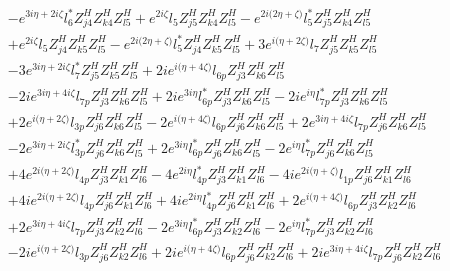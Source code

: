 \begin{align}
 &- e^{3 i \eta +2 i \zeta } l_6^* Z_{{j 4}}^{H} Z_{{k 4}}^{H} Z_{{l 5}}^{H} +e^{2 i \zeta } l_5 Z_{{j 5}}^{H} Z_{{k 4}}^{H} Z_{{l 5}}^{H} - e^{2 i \Big(2 \eta +\zeta \Big)} l_5^* Z_{{j 5}}^{H} Z_{{k 4}}^{H} Z_{{l 5}}^{H} \nonumber \\ 
 &+e^{2 i \zeta } l_5 Z_{{j 4}}^{H} Z_{{k 5}}^{H} Z_{{l 5}}^{H} - e^{2 i \Big(2 \eta +\zeta \Big)} l_5^* Z_{{j 4}}^{H} Z_{{k 5}}^{H} Z_{{l 5}}^{H} +3 e^{i \Big(\eta +2 \zeta \Big)} l_7 Z_{{j 5}}^{H} Z_{{k 5}}^{H} Z_{{l 5}}^{H} \nonumber \\ 
 &-3 e^{3 i \eta +2 i \zeta } l_7^* Z_{{j 5}}^{H} Z_{{k 5}}^{H} Z_{{l 5}}^{H} +2 i e^{i \Big(\eta +4 \zeta \Big)} l_{6p} Z_{{j 3}}^{H} Z_{{k 6}}^{H} Z_{{l 5}}^{H} \nonumber \\ 
 &-2 i e^{3 i \eta +4 i \zeta } l_{7p} Z_{{j 3}}^{H} Z_{{k 6}}^{H} Z_{{l 5}}^{H} +2 i e^{3 i \eta } l_{6p}^* Z_{{j 3}}^{H} Z_{{k 6}}^{H} Z_{{l 5}}^{H} -2 i e^{i \eta } l_{7p}^* Z_{{j 3}}^{H} Z_{{k 6}}^{H} Z_{{l 5}}^{H} \nonumber \\ 
 &+2 e^{i \Big(\eta +2 \zeta \Big)} l_{3p} Z_{{j 6}}^{H} Z_{{k 6}}^{H} Z_{{l 5}}^{H} -2 e^{i \Big(\eta +4 \zeta \Big)} l_{6p} Z_{{j 6}}^{H} Z_{{k 6}}^{H} Z_{{l 5}}^{H} +2 e^{3 i \eta +4 i \zeta } l_{7p} Z_{{j 6}}^{H} Z_{{k 6}}^{H} Z_{{l 5}}^{H} \nonumber \\ 
 &-2 e^{3 i \eta +2 i \zeta } l_{3p}^* Z_{{j 6}}^{H} Z_{{k 6}}^{H} Z_{{l 5}}^{H} +2 e^{3 i \eta } l_{6p}^* Z_{{j 6}}^{H} Z_{{k 6}}^{H} Z_{{l 5}}^{H} -2 e^{i \eta } l_{7p}^* Z_{{j 6}}^{H} Z_{{k 6}}^{H} Z_{{l 5}}^{H} \nonumber \\ 
 &+4 e^{2 i \Big(\eta +2 \zeta \Big)} l_{4p} Z_{{j 3}}^{H} Z_{{k 1}}^{H} Z_{{l 6}}^{H} -4 e^{2 i \eta } l_{4p}^* Z_{{j 3}}^{H} Z_{{k 1}}^{H} Z_{{l 6}}^{H} -4 i e^{2 i \Big(\eta +\zeta \Big)} l_{1p} Z_{{j 6}}^{H} Z_{{k 1}}^{H} Z_{{l 6}}^{H} \nonumber \\ 
 &+4 i e^{2 i \Big(\eta +2 \zeta \Big)} l_{4p} Z_{{j 6}}^{H} Z_{{k 1}}^{H} Z_{{l 6}}^{H} +4 i e^{2 i \eta } l_{4p}^* Z_{{j 6}}^{H} Z_{{k 1}}^{H} Z_{{l 6}}^{H} +2 e^{i \Big(\eta +4 \zeta \Big)} l_{6p} Z_{{j 3}}^{H} Z_{{k 2}}^{H} Z_{{l 6}}^{H} \nonumber \\ 
 &+2 e^{3 i \eta +4 i \zeta } l_{7p} Z_{{j 3}}^{H} Z_{{k 2}}^{H} Z_{{l 6}}^{H} -2 e^{3 i \eta } l_{6p}^* Z_{{j 3}}^{H} Z_{{k 2}}^{H} Z_{{l 6}}^{H} -2 e^{i \eta } l_{7p}^* Z_{{j 3}}^{H} Z_{{k 2}}^{H} Z_{{l 6}}^{H} \nonumber \\ 
 &-2 i e^{i \Big(\eta +2 \zeta \Big)} l_{3p} Z_{{j 6}}^{H} Z_{{k 2}}^{H} Z_{{l 6}}^{H} +2 i e^{i \Big(\eta +4 \zeta \Big)} l_{6p} Z_{{j 6}}^{H} Z_{{k 2}}^{H} Z_{{l 6}}^{H} +2 i e^{3 i \eta +4 i \zeta } l_{7p} Z_{{j 6}}^{H} Z_{{k 2}}^{H} Z_{{l 6}}^{H} \nonumber \\ 

\end{align}
